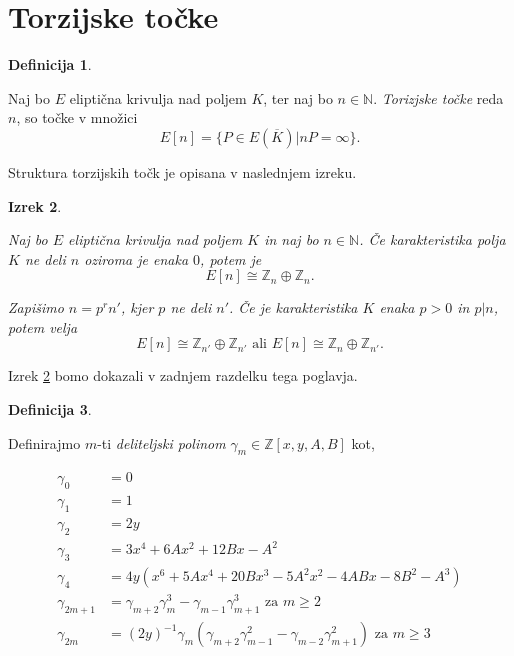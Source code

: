 \documentclass[12pt,a4paper,twoside]{article}
\theoremstyle{definition} %
\newtheorem{definicija}{Definicija}[section]
\theoremstyle{plain} %
\newtheorem{izrek}[definicija]{Izrek}
\numberwithin{equation}{section}  %
\newcommand{\N}{\mathbb N}
\newcommand{\Z}{\mathbb Z}
\newcommand{\E}[1]{E({#1})}
\begin{document}
\section{Torzijske točke}

\begin{definicija}~

Naj bo $E$ eliptična krivulja nad poljem $K$, ter naj bo $n\in \N$. \emph{Torizjske točke} reda $n$, so točke v množici
$$E[n] = \{ P \in \E{\overline{K}} | nP = \infty \}.$$
\end{definicija}

Struktura torzijskih točk je opisana v naslednjem izreku.

\begin{izrek}~

\label{IzrekTor}
Naj bo $E$ eliptična krivulja nad poljem $K$ in naj bo $n \in \N$. Če karakteristika polja $K$ ne deli $n$ oziroma je enaka $0$, potem je
$$E[n] \cong \mathbb{Z}_n \oplus \mathbb{Z}_n.$$

Zapišimo $n=p^rn'$, kjer $p$ ne deli $n'$. Če je karakteristika $K$ enaka $p >0$ in $p|n$, potem velja
$$E[n] \cong \mathbb{Z}_{n'} \oplus \mathbb{Z}_{n'} \text{ ali } E[n] \cong \mathbb{Z}_n \oplus \mathbb{Z}_{n'}.$$

\end{izrek}

Izrek \ref{IzrekTor} bomo dokazali v zadnjem razdelku tega poglavja.

\begin{definicija}~

Definirajmo $m$-ti \emph{deliteljski polinom} $\gamma_m \in \Z[x,y,A,B]$ kot,


\begin{align}
\gamma_0 &{}= 0  \nonumber \\
\gamma_1 &{}= 1  \nonumber \\
\gamma_2 &{}= 2y  \nonumber \\
\gamma_3 &{}= 3x^4 + 6Ax^2 + 12Bx-A^2 \nonumber \\
\gamma_4 &{}= 4y(x^6+5Ax^4+20Bx^3-5A^2x^2-4ABx-8B^2-A^3) \nonumber \\
\gamma_{2m+1} &{}= \gamma_{m+2}\gamma_{m}^3-\gamma_{m-1}\gamma_{m+1}^3 \text{ za } m \geq 2 \nonumber \\
\gamma_{2m} &{}= (2y)^{-1}\gamma_{m}(\gamma_{m+2}\gamma_{m-1}^2-\gamma_{m-2}\gamma_{m+1}^2)\text{ za } m \geq 3 \nonumber
\end{align}

\end{definicija}
\end{document}
